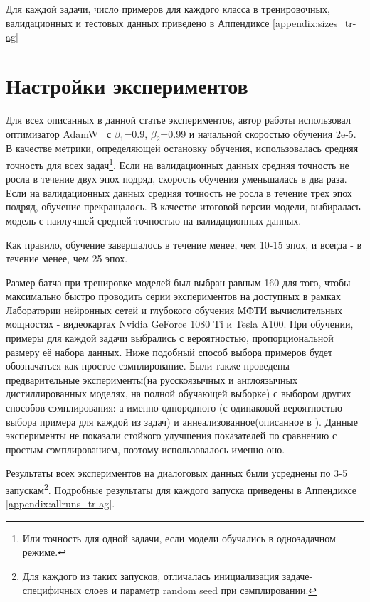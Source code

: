 Для каждой задачи, число примеров для каждого класса в тренировочных, валидационных и тестовых данных приведено в Аппендиксе \ref{appendix:sizes_tr-ag} 

\section {Настройки экспериментов}\label{ch:tr-ag:settings}
Для всех описанных в данной статье экспериментов, автор работы использовал оптимизатор AdamW~\cite{kingma_2014} с  $\beta_1$=0.9, $\beta_2$=0.99 и начальной скоростью обучения 2e-5. В качестве метрики, определяющей остановку обучения, использовалась средняя точность для всех задач\footnote{Или точность для одной задачи, если модели обучались в однозадачном режиме.}. Если на валидационных данных средняя точность не росла в течение двух эпох подряд, скорость обучения уменьшалась в два раза. Если на валидационных данных средняя точность не росла в течение трех эпох подряд, обучение прекращалось. В качестве итоговой версии модели, выбиралась модель с наилучшей средней точностью на валидационных данных. 

Как правило, обучение завершалось в течение менее, чем 10-15 эпох, и всегда - в течение менее, чем 25 эпох. 

Размер батча при тренировке моделей был выбран равным 160 для того, чтобы максимально быстро проводить серии экспериментов на доступных в рамках Лаборатории нейронных сетей и глубокого обучения МФТИ вычислительных мощностях - видеокартах Nvidia GeForce 1080 Ti и Tesla A100. 
При обучении, примеры для каждой задачи выбрались с вероятностью, пропорциональной размеру её набора данных. Ниже подобный способ выбора примеров будет обозначаться как простое сэмплирование. Были также проведены предварительные эксперименты(на русскоязычных и англоязычных дистиллированных моделях, на полной обучающей выборке) с выбором других способов сэмплирования: а именно однородного (с одинаковой вероятностью выбора примера для каждой из задач) и аннеализованное(описанное в \cite{stickland_2019}). Данные эксперименты не показали стойкого улучшения показателей по сравнению с простым сэмплированием, поэтому использовалось именно оно. 

Результаты всех экспериментов на диалоговых данных были усреднены по 3-5 запускам\footnote{ Для каждого из таких запусков, отличалась инициализация задаче-специфичных слоев и параметр random seed при сэмплировании.}. Подробные результаты для каждого запуска приведены в Аппендиксе \ref{appendix:allruns_tr-ag}. 

